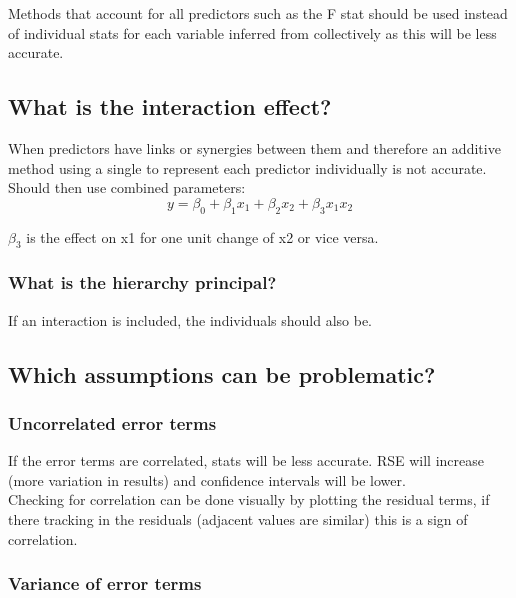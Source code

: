 \documentclass[11pt]{scrartcl} %
\begin{document}
Methods that account for all predictors such as the F stat should be used instead of individual
stats for each variable inferred from collectively as this will be less accurate.

\subsection{What is the interaction effect?}

When predictors have links or synergies between them and therefore an additive method using a single
to represent each predictor individually is not accurate.\\

Should then use combined parameters:
\begin{equation}
	y = \beta_0 + \beta_1x_1 + \beta_2x_2 + \beta_3x_1x_2
\end{equation}

\(\beta_3\) is the effect on x1 for one unit change of x2 or vice versa.

\subsubsection{What is the hierarchy principal?}

If an interaction is included, the individuals should also be.

\subsection{Which assumptions can be problematic?}

\subsubsection{Uncorrelated error terms}

If the error terms are correlated, stats will be less accurate. RSE will increase (more variation in results)
and confidence intervals will be lower.\\

Checking for correlation can be done visually by plotting the residual terms, if there tracking in the residuals
(adjacent values are similar) this is a sign of correlation.

\subsubsection{Variance of error terms}
\end{document}
